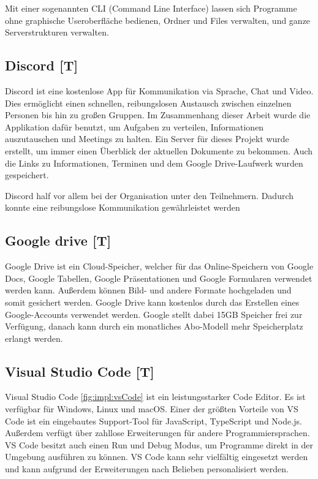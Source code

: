 Mit einer sogenannten CLI (Command Line Interface) lassen sich Programme ohne graphische Useroberfläche bedienen, Ordner und Files verwalten, und ganze Serverstrukturen verwalten. 
\subsection{Discord [T]} 
Discord ist eine kostenlose App für Kommunikation via Sprache, Chat und Video. Dies ermöglicht einen schnellen, reibungslosen Austausch zwischen einzelnen Personen bis hin zu großen Gruppen. Im Zusammenhang dieser Arbeit wurde die Applikation dafür benutzt, um Aufgaben zu verteilen, Informationen auszutauschen und Meetings zu halten. Ein Server für dieses Projekt wurde erstellt, um immer einen Überblick der aktuellen Dokumente zu bekommen. Auch die Links zu Informationen, Terminen und dem Google Drive-Laufwerk wurden gespeichert.   

Discord half vor allem bei der Organisation unter den Teilnehmern. Dadurch konnte eine reibungslose Kommunikation gewährleistet werden  
\subsection{Google drive [T]} 

Google Drive ist ein Cloud-Speicher, welcher für das Online-Speichern von Google Docs, Google Tabellen, Google Präsentationen und Google Formularen verwendet werden kann. Außerdem können Bild- und andere Formate hochgeladen und somit gesichert werden. Google Drive kann kostenlos durch das Erstellen eines Google-Accounts verwendet werden. Google stellt dabei 15GB Speicher frei zur Verfügung, danach kann durch ein monatliches Abo-Modell mehr Speicherplatz erlangt werden. \cite{OneDriveOfficialSite}


\subsection{Visual Studio Code [T]} 
Visual Studio Code \ref{fig:impl:vsCode} ist ein leistungsstarker Code Editor. Es ist verfügbar für Windows, Linux und macOS. 
Einer der größten Vorteile von VS Code ist ein eingebautes Support-Tool für JavaScript, TypeScript und Node.js. Außerdem verfügt über zahllose Erweiterungen für andere Programmiersprachen. VS Code besitzt auch einen Run und Debug Modus, um Programme direkt in der Umgebung ausführen zu können. 
VS Code kann sehr vielfältig eingesetzt werden und kann aufgrund der Erweiterungen nach Belieben personalisiert werden. \cite{VSCodeOfficialSite}

